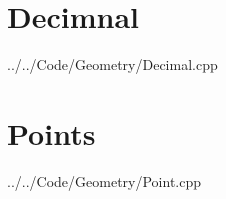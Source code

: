 \documentclass[11pt, fleqn]{report}                             %
\theoremstyle{break}                                            %
\begin{document}
\begin{multicols}{2}
    \section{Decimnal}
        
        {../../Code/Geometry/Decimal.cpp}

    \section{Points}
        
        {../../Code/Geometry/Point.cpp}
 
\end{multicols}

        
\end{document}
